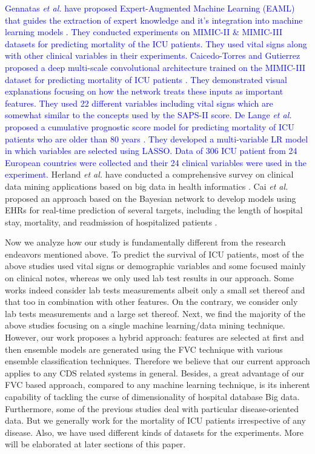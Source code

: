 \textcolor{blue}{Gennatas \textit{et al.} have proposed Expert-Augmented Machine Learning (EAML) that guides the extraction of expert knowledge and it's integration into machine learning models \cite{Gennatas2019}. They conducted experiments on MIMIC-II \& MIMIC-III datasets for predicting mortality of the ICU patients. They used vital signs along with other clinical variables in their experiments. Caicedo-Torres and Gutierrez proposed a deep multi-scale convolutional architecture trained on the MIMIC-III dataset for predicting mortality of ICU patients \cite{Torres2019}. They demonstrated visual explanations focusing on how the network treats these inputs as important features. They used 22 different variables including vital signs which are somewhat similar to the concepts used by the SAPS-II score. De Lange \textit{et al.} proposed a cumulative prognostic score model for predicting mortality of ICU patients who are older than 80 years \cite{Lange2019}. They developed a multi-variable LR model in which variables are selected using LASSO. Data of 306 ICU patient from 24 European countries were collected and their 24 clinical variables were used in the experiment.} Herland \textit{et al.} have conducted a comprehensive survey on clinical data mining applications based on big data in health informatics \cite{Herland}. Cai \textit{et al.}  proposed an approach based on the Bayesian network to develop models using EHRs for real-time prediction of several targets, including the length of hospital stay, mortality, and readmission of hospitalized patients \cite{Cai:2016}.

Now we analyze how our study is fundamentally different from the research endeavors mentioned above. To predict the survival of ICU patients, most of the above studies used vital signs or demographic variables and some focused mainly on clinical notes, whereas we only used lab test results in our approach. Some works indeed consider lab tests measurements albeit only a small set thereof and that too in combination with other features. On the contrary, we consider only lab tests measurements and a large set thereof. Next, we find the majority of the above studies focusing on a single machine learning/data mining technique. However, our work proposes a hybrid approach: features are selected at first and then ensemble models are generated using the FVC technique with various ensemble classification techniques. Therefore we believe that our current approach applies to any CDS related systems in general. Besides, a great advantage of our FVC based approach, compared to any machine learning technique, is its inherent capability of tackling the curse of dimensionality\cite{Meyer2018} of hospital database Big data. Furthermore, some of the previous studies deal with particular disease-oriented data. But we generally work for the mortality of ICU patients irrespective of any disease. Also, we have used different kinds of datasets for the experiments. More will be elaborated at later sections of this paper.


